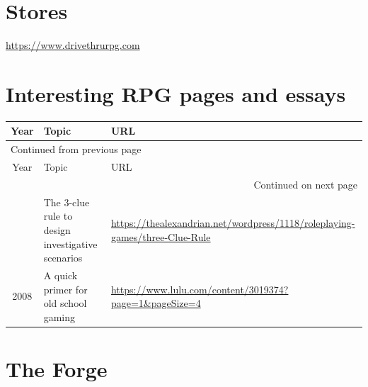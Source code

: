 \documentclass[a4paper, 11pt, twoside]{article}
\begin{document}
\section{Stores}
\label{sec:org28ea13f}

\url{https://www.drivethrurpg.com}

\section{Interesting RPG pages and essays}
\label{sec:org247d0ec}

\begin{longtable}{cp{8cm}p{6cm}}
Year & Topic & URL\\
\hline
\endfirsthead
\multicolumn{3}{l}{Continued from previous page} \\
\hline

Year & Topic & URL \\

\hline
\endhead
\hline\multicolumn{3}{r}{Continued on next page} \\
\endfoot
\endlastfoot
\hline
2008 & The 3-clue rule to design investigative scenarios & \url{https://thealexandrian.net/wordpress/1118/roleplaying-games/three-Clue-Rule}\\
2008 & A quick primer for old school gaming & \url{https://www.lulu.com/content/3019374?page=1\&pageSize=4}\\
\end{longtable}

\section{The Forge}
\label{sec:org1820a02}
\end{document}
